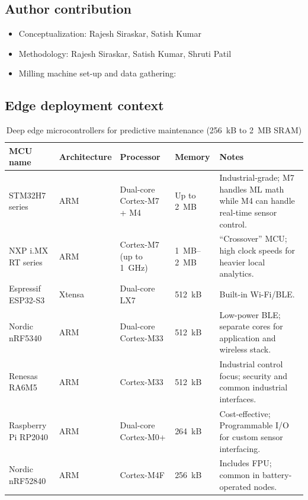 \documentclass[sn-basic]{sn-jnl} %
\renewcommand{\arraystretch}{1.2}
\begin{document}
\subsection*{Author contribution}
\begin{itemize}
	\item Conceptualization: Rajesh Siraskar, Satish Kumar
	\item Methodology: Rajesh Siraskar, Satish Kumar, Shruti Patil
	\item Milling machine set-up and data gathering:  
\end{itemize}

\begin{appendices}

\section{Edge deployment context}\label{app:edge_context}

\begin{table}[htbp]
	\centering
	\caption{Deep edge microcontrollers for predictive maintenance (256~kB to 2~MB SRAM)}
	\label{tab:deep_edge_mcus}
	\renewcommand{\arraystretch}{1.3}
	\begin{tabular}{@{} l l l l L{5.5cm} @{}}
		\toprule
		\textbf{MCU name} & \textbf{Architecture} & \textbf{Processor} & \textbf{Memory} & \textbf{Notes} \\
		\midrule
		STM32H7 series & ARM & Dual-core Cortex-M7 + M4 & Up to 2~MB & Industrial-grade; M7 handles ML math while M4 can handle real-time sensor control. \\
		NXP i.MX RT series & ARM & Cortex-M7 (up to 1~GHz) & 1~MB--2~MB & ``Crossover'' MCU; high clock speeds for heavier local analytics. \\
		Espressif ESP32-S3 & Xtensa & Dual-core LX7 & 512~kB & Built-in Wi-Fi/BLE.\\
		Nordic nRF5340 & ARM & Dual-core Cortex-M33 & 512~kB & Low-power BLE; separate cores for application and wireless stack. \\
		Renesas RA6M5 & ARM & Cortex-M33 & 512~kB & Industrial control focus; security and common industrial interfaces. \\
		Raspberry Pi RP2040 & ARM & Dual-core Cortex-M0+ & 264~kB & Cost-effective; Programmable I/O for custom sensor interfacing. \\
		Nordic nRF52840 & ARM & Cortex-M4F & 256~kB & Includes FPU; common in battery-operated nodes. \\
		\bottomrule
	\end{tabular}
\end{table}


\end{appendices}
\end{document}
